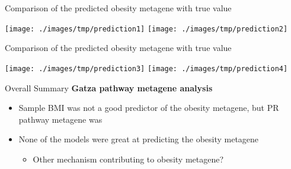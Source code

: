 \documentclass[handout]{beamer}
\begin{document}
\begin{frame}{\normalsize Comparison of the predicted obesity metagene with true value}
	\begin{center}
		\texttt{[image: ./images/tmp/prediction1]}
		\texttt{[image: ./images/tmp/prediction2]}
	\end{center}
\end{frame}

\begin{frame}{\normalsize Comparison of the predicted obesity metagene with true value}
	\begin{center}
		\texttt{[image: ./images/tmp/prediction3]}
		\texttt{[image: ./images/tmp/prediction4]}
	\end{center}
\end{frame}


\begin{frame}{Overall Summary}
	\textbf{Gatza pathway metagene analysis}
	\begin{itemize}
		\item Sample BMI was not a good predictor of the obesity metagene, but PR pathway metagene was
		\item None of the models were great at predicting the obesity metagene
			\begin{itemize}
				\item Other mechanism contributing to obesity metagene?
			\end{itemize}
	\end{itemize}
\end{frame}
\end{document}
